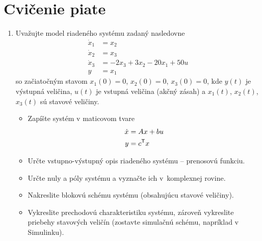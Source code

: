 \documentclass[a4paper, 10pt, ]{article}
\begin{document}
\section{Cvičenie piate}



\begin{enumerate}[leftmargin=0pt, labelsep=4mm, itemsep=0pt]

    \item Uvažujte model riadeného systému zadaný nasledovne
    \begin{subequations} \label{system3radu}
    \begin{align}
        \dot{x}_1 &= x_2   \\
        \dot{x}_2 &= x_3   \\
        \dot{x}_3 &= -2 x_3 + 3 x_2 - 20 x_1 + 50 u  \\
        y &= x_1
    \end{align}
    \end{subequations}
    so začiatočným stavom $x_1(0)=0$, $x_2(0)=0$, $x_3(0)=0$, kde $y(t)$ je výstupná veličina, $u(t)$ je vstupná veličina (akčný zásah) a $x_1(t)$, $x_2(t)$, $x_3(t)$ sú stavové veličiny.

    \begin{itemize}[leftmargin=0pt, labelsep=4mm, itemsep=0pt]

        \item Zapíšte systém v maticovom tvare
        \begin{subequations}
            \begin{align}
                 \dot x &= A x + b u \\
                 y &= c^{\mathsf{T}} x
            \end{align}
        \end{subequations}

        \item Určte vstupno-výstupný opis riadeného systému -- prenosovú funkciu. 
        \item Určte nuly a póly systému a vyznačte ich v~komplexnej rovine. 
        \item Nakreslite blokovú schému systému (obsahujúcu stavové veličiny). 
        \item Vykreslite prechodovú charakteristiku systému, zároveň vykreslite priebehy stavových veličín (zostavte simulačnú schému, napríklad v Simulinku). 

    \end{itemize}






\end{enumerate}
\end{document}
